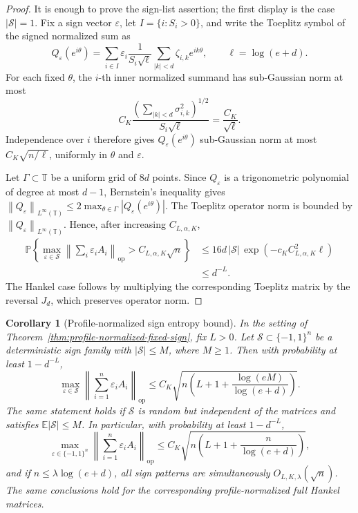 \documentclass[11pt]{amsart}
\numberwithin{equation}{section}
\newtheorem{corollary}[theorem]{Corollary}
\theoremstyle{definition}
\theoremstyle{remark}
\newcommand{\T}{\mathbb T}
\newcommand{\op}{\mathrm{op}}
\newcommand{\Prob}{\mathbb P}
\newcommand{\Exp}{\mathbb E}
\newcommand{\norm}[1]{\left\lVert #1\right\rVert}
\newcommand{\abs}[1]{\left\lvert #1\right\rvert}
\newcommand{\eps}{\varepsilon}
\begin{document}
\begin{proof}
It is enough to prove the sign-list assertion; the first display is the case
\(\abs{\mathcal S}=1\).  Fix a sign vector \(\eps\), let
\(I=\{i:S_i>0\}\), and write the Toeplitz symbol of the signed normalized sum as
\[
  Q_\eps(e^{i\theta})
  =
  \sum_{i\in I}\eps_i\frac1{S_i\sqrt{\ell}}
  \sum_{|k|<d}\zeta_{i,k}e^{ik\theta},
  \qquad \ell=\log(e+d).
\]
For each fixed \(\theta\), the \(i\)-th inner normalized summand has
sub-Gaussian norm at most
\[
  C_K\frac{(\sum_{|k|<d}\sigma_{i,k}^2)^{1/2}}{S_i\sqrt{\ell}}
  =\frac{C_K}{\sqrt{\ell}}.
\]
Independence over \(i\) therefore gives \(Q_\eps(e^{i\theta})\) sub-Gaussian
norm at most \(C_K\sqrt{n/\ell}\), uniformly in \(\theta\) and \(\eps\).

Let \(\Gamma\subset\T\) be a uniform grid of \(8d\) points.  Since \(Q_\eps\) is
a trigonometric polynomial of degree at most \(d-1\), Bernstein's inequality
gives \(\norm{Q_\eps}_{L^\infty(\T)}\le2\max_{\theta\in\Gamma}
\abs{Q_\eps(e^{i\theta})}\).  The Toeplitz operator norm is bounded by
\(\norm{Q_\eps}_{L^\infty(\T)}\).  Hence, after increasing
\(C_{L,\alpha,K}\),
\[
\begin{aligned}
  \Prob\left\{\max_{\eps\in\mathcal S}
  \norm{\sum_i\eps_iA_i}_{\op}
  > C_{L,\alpha,K}\sqrt n\right\}
  &\le
  16d\,\abs{\mathcal S}\,
  \exp(-c_K C_{L,\alpha,K}^2\ell)  \\
  &\le d^{-L}.
\end{aligned}
\]
The Hankel case follows by multiplying the corresponding Toeplitz matrix by
the reversal \(J_d\), which preserves operator norm.
\end{proof}

\begin{corollary}[Profile-normalized sign entropy bound]
\label{cor:profile-normalized-sign-entropy}
In the setting of Theorem~\ref{thm:profile-normalized-fixed-sign}, fix
\(L>0\).  Let \(\mathcal S\subset\{-1,1\}^n\) be a deterministic sign family
with \(\abs{\mathcal S}\le M\), where \(M\ge1\).  Then with probability at least
\(1-d^{-L}\),
\[
  \max_{\eps\in\mathcal S}
  \norm{\sum_{i=1}^n\eps_iA_i}_{\op}
  \le
  C_K\sqrt{n\left(L+1+\frac{\log(eM)}{\log(e+d)}\right)} .
\]
The same statement holds if \(\mathcal S\) is random but independent of the
matrices and satisfies \(\Exp\abs{\mathcal S}\le M\).  In particular, with
probability at least \(1-d^{-L}\),
\[
  \max_{\eps\in\{-1,1\}^n}
  \norm{\sum_{i=1}^n\eps_iA_i}_{\op}
  \le
  C_K\sqrt{n\left(L+1+\frac{n}{\log(e+d)}\right)} ,
\]
and if \(n\le\lambda\log(e+d)\), all sign patterns are simultaneously
\(O_{L,K,\lambda}(\sqrt n)\).  The same conclusions hold for the corresponding
profile-normalized full Hankel matrices.
\end{corollary}
\end{document}
